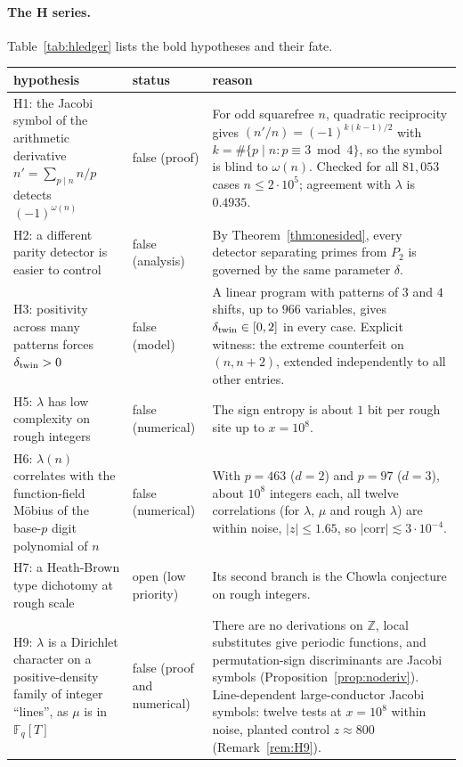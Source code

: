\paragraph{The H series.} Table~\ref{tab:hledger} lists the bold hypotheses and their fate.

\begin{table}[H]
\centering
\small
\begin{tabular}{p{3.4cm}p{1.6cm}p{7.4cm}}
\toprule
hypothesis & status & reason\\
\midrule
H1: the Jacobi symbol of the arithmetic derivative $n'=\sum_{p\mid n}n/p$ detects $(-1)^{\omega(n)}$ & false (proof) & For odd squarefree $n$, quadratic reciprocity gives $(n'/n)=(-1)^{k(k-1)/2}$ with $k=\#\{p\mid n:p\equiv3\bmod4\}$, so the symbol is blind to $\omega(n)$. Checked for all $81{,}053$ cases $n\le2\cdot10^5$; agreement with $\lambda$ is $0.4935$.\\
H2: a different parity detector is easier to control & false (analysis) & By Theorem~\ref{thm:onesided}, every detector separating primes from $P_2$ is governed by the same parameter $\delta$.\\
H3: positivity across many patterns forces $\delta_{\rm twin}>0$ & false (model) & A linear program with patterns of $3$ and $4$ shifts, up to $966$ variables, gives $\delta_{\rm twin}\in[0,2]$ in every case. Explicit witness: the extreme counterfeit on $(n,n+2)$, extended independently to all other entries.\\
H5: $\lambda$ has low complexity on rough integers & false (numerical) & The sign entropy is about $1$ bit per rough site up to $x=10^8$.\\
H6: $\lambda(n)$ correlates with the function-field Möbius of the base-$p$ digit polynomial of $n$ & false (numerical) & With $p=463$ ($d=2$) and $p=97$ ($d=3$), about $10^8$ integers each, all twelve correlations (for $\lambda$, $\mu$ and rough $\lambda$) are within noise, $|z|\le1.65$, so $|\mathrm{corr}|\lesssim3\cdot10^{-4}$.\\
H7: a Heath-Brown type dichotomy at rough scale & open (low priority) & Its second branch is the Chowla conjecture on rough integers.\\
H9: $\lambda$ is a Dirichlet character on a positive-density family of integer ``lines'', as $\mu$ is in $\mathbb F_q[T]$ & false (proof and numerical) & There are no derivations on $\mathbb Z$, local substitutes give periodic functions, and permutation-sign discriminants are Jacobi symbols (Proposition~\ref{prop:noderiv}). Line-dependent large-conductor Jacobi symbols: twelve tests at $x=10^8$ within noise, planted control $z\approx800$ (Remark~\ref{rem:H9}).\\

\end{tabular}
\end{table}
